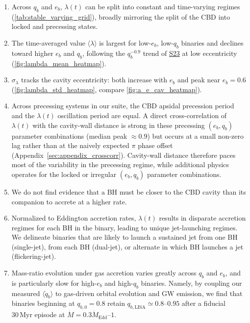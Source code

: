 \documentclass[fleqn,usenatbib]{mnras}
\newcommand{\Stwentythree}{\href{https://doi.org/10.1093/mnras/stac3263}{S23}\xspace}
\begin{document}
\begin{enumerate}
    \item Across $q_b$ and $e_b$, $\lambda(t)$ can be split into constant and time-varying regimes (\autoref{tab:stable_varying_grid}), broadly mirroring the split of the CBD into locked and precessing states.
    \item The time-averaged value $\langle \lambda \rangle$ is largest for low-$e_b$, low-$q_b$ binaries and declines toward higher $e_b$ and $q_b$, following the $q_b^{-0.9}$ trend of \Stwentythree at low eccentricity (\autoref{fig:lambda_mean_heatmap}).
    \item $\sigma_{\lambda}$ tracks the cavity eccentricity: both increase with $e_b$ and peak near $e_b = 0.6$ (\autoref{fig:lambda_std_heatmap}, compare \autoref{fig:a_e_cav_heatmap}).
    \item Across precessing systems in our suite, the CBD apsidal precession period and the $\lambda(t)$ oscillation period are equal. A direct cross-correlation of $\lambda(t)$ with the cavity-wall distance is strong in these precessing $(e_b,q_b)$ parameter combinations (median peak $\approx 0.9$) but occurs at a small non-zero lag rather than at the naively expected $\pi$ phase offset (Appendix~\ref{sec:appendix_crosscorr}). Cavity-wall distance therefore paces most of the variability in the precessing regime, while additional physics operates for the locked or irregular $(e_b,q_b)$ parameter combinations.
    \item We do not find evidence that a BH must be closer to the CBD cavity than its companion to accrete at a higher rate.
    \item Normalized to Eddington accretion rates, $\lambda(t)$ results in disparate accretion regimes for each BH in the binary, leading to unique jet-launching regimes. We delineate binaries that are likely to launch a sustained jet from one BH (single-jet), from each BH (dual-jet), or alternate in which BH launches a jet (flickering-jet).
    \item Mass-ratio evolution under gas accretion varies greatly across $q_b$ and $e_b$, and is particularly slow for high-$e_b$ and high-$q_b$ binaries. Namely, by coupling our measured $\langle \dot{q}_b \rangle$ to gas-driven orbital evolution and GW emission, we find that binaries beginning at $q_{b,0}=0.8$ retain $q_{b,\mathrm{LISA}}\simeq0.8$–$0.95$ after a fiducial $30\,\mathrm{Myr}$ episode at $\dot{M}=0.3\dot{M}_{\mathrm{Edd}}$–$1$.

\end{enumerate}
\end{document}
